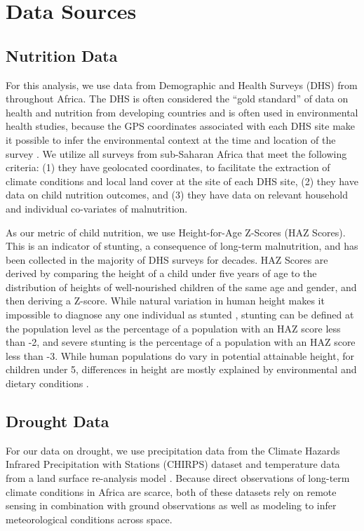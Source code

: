 \documentclass{article}
\begin{document}
\section{Data Sources}

\subsection{Nutrition Data}
For this analysis, we use data from Demographic and Health Surveys (DHS) from throughout Africa.  The DHS is often considered the ``gold standard'' of data on health and nutrition from developing countries and is often used in environmental health studies, because the GPS coordinates associated with each DHS site make it possible to infer the environmental context at the time and location of the survey \cite{Brown2014}.  We utilize all surveys from sub-Saharan Africa that meet the following criteria: (1) they have geolocated coordinates, to facilitate the extraction of climate conditions and local land cover at the site of each DHS site, (2) they have data on child nutrition outcomes, and (3) they have data on relevant household and individual co-variates of malnutrition.

As our metric of child nutrition, we use Height-for-Age Z-Scores (HAZ Scores).  This is an indicator of stunting, a consequence of long-term malnutrition, and has been collected in the majority of DHS surveys for decades.  HAZ Scores are derived by comparing the height of a child under five years of age to the distribution of heights of well-nourished children of the same age and gender, and then deriving a Z-score.  While natural variation in human height makes it impossible to diagnose any one individual as stunted \cite{Perumal2018}, stunting can be defined at the population level as the percentage of a population with an HAZ score less than -2, and severe stunting is the percentage of a population with an HAZ score less than -3.  While human populations do vary in potential attainable height, for children under 5, differences in height are mostly explained by environmental and dietary conditions \cite{Habicht1974}.

\subsection{Drought Data}
For our data on drought, we use precipitation data from the Climate Hazards Infrared Precipitation with Stations (CHIRPS) dataset \citep{Funk2015} and temperature data from a land surface re-analysis model \citep{Sheffield2006}.  Because direct observations of long-term climate conditions in Africa are scarce, both of these datasets rely on remote sensing in combination with ground observations as well as modeling to infer meteorological conditions across space.
\end{document}
